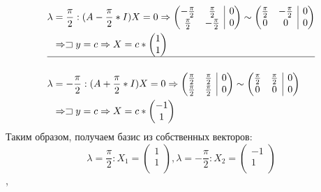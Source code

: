 \documentclass[12pt, a4paper]{article}
\begin{document}
\begin{equation*}
\begin{aligned}
\lambda & =\frac{\pi}{2}: (A-\frac{\pi}{2}*I)X=0 \Rightarrow 
\left(
\begin{array}{@{}cc|c@{}}
-\frac{\pi}{2} & \frac{\pi}{2}  & 0\\
\frac{\pi}{2}  & -\frac{\pi}{2}  & 0\\
\end{array}
\right) \sim \left(
\begin{array}{@{}cc|c@{}}
\frac{\pi}{2} & -\frac{\pi}{2}  & 0\\
0  & 0  & 0\\
\end{array}
\right)\\
&\Rightarrow \sqsupset y=c \Rightarrow X = c * \begin{pmatrix}
1\\
1\\
\end{pmatrix}\\
\hline\\
\lambda & =-\frac{\pi}{2}: (A+\frac{\pi}{2}*I)X=0 \Rightarrow 
\left(
\begin{array}{@{}cc|c@{}}
\frac{\pi}{2} & \frac{\pi}{2}  & 0\\
\frac{\pi}{2}  & \frac{\pi}{2}  & 0\\
\end{array}
\right) \sim \left(
\begin{array}{@{}cc|c@{}}
\frac{\pi}{2} & \frac{\pi}{2}  & 0\\
0  & 0  & 0\\
\end{array}
\right)\\
&\Rightarrow \sqsupset y=c \Rightarrow X = c * \begin{pmatrix}
-1\\
1\\
\end{pmatrix}\\
\end{aligned}
\end{equation*}
Таким образом, получаем базис из собственных векторов:
\begin{equation} \label{bBasis}
\lambda = \frac{\pi}{2}: X_1 =\begin{pmatrix}
1\\
1\\
\end{pmatrix}, \lambda = -\frac{\pi}{2}: X_2 = \begin{pmatrix}
-1\\
1\\
\end{pmatrix}
\end{equation},
\end{document}
